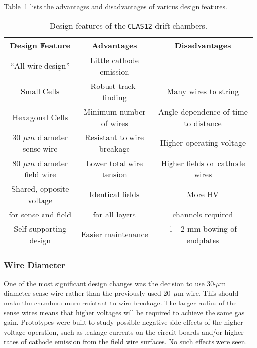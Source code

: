 Table~\ref{fwd-dc-design-features} lists the advantages and disadvantages
of various design features.
\begin{table}[ht]
\begin{center}
\begin{tabular} {||c|c|c||} \hline \hline
{\bf Design Feature  }       &{\bf Advantages} &{\bf Disadvantages}\\ \hline
``All-wire design'' & Little cathode emission & \\ \hline
Small Cells & Robust track-finding  & Many wires to string \\ \hline
Hexagonal Cells & Minimum number of wires  & Angle-dependence of time to distance  \\ \hline
30 $\mu m$ diameter sense wire & Resistant to wire breakage & Higher operating voltage \\ \hline
80 $\mu m$ diameter field wire & Lower total wire tension & Higher fields on cathode wires \\ \hline
Shared, opposite voltage  & Identical fields & More HV \\
for sense and field & for all layers & channels required \\ \hline
Self-supporting design & Easier maintenance & 1 - 2 mm bowing of endplates \\ \hline
\end{tabular}
\caption{\small{Design features of the {\tt CLAS12} drift chambers.}}
\label{fwd-dc-design-features}
\end{center}
\end{table}

\subsubsection{Wire Diameter}
One of the most significant design changes was the decision 
to use 30-$\mu$m diameter sense wire rather than the previously-used 
20~$\mu$m wire. 
This should make the chambers more resistant to wire 
breakage.  The larger radius of the sense wires means that higher 
voltages will be required to achieve the same gas gain.
Prototypes were built to study possible negative side-effects of the 
higher voltage operation, such as leakage currents on the circuit boards 
and/or higher rates of cathode emission from the field wire surfaces.
No such effects were seen.

